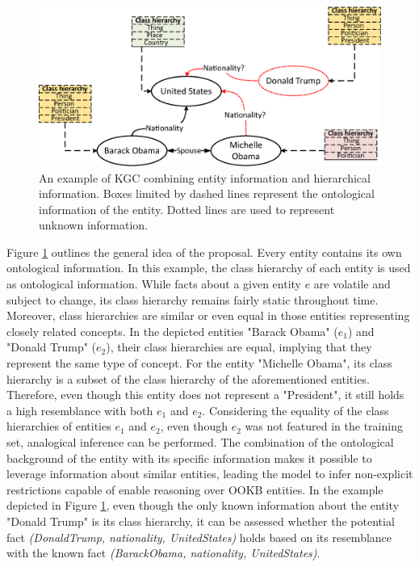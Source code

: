 \begin{figure}
    \centering
    \includegraphics[width=.8\linewidth]{5_kbsintegrationdl/figures/KGCexample.eps}
    \caption{An example of KGC combining entity information and hierarchical information. Boxes limited by dashed lines represent the ontological information of the entity. Dotted lines are used to represent unknown information.}
    \label{fig:kgc_onto_example}
\end{figure}

Figure \ref{fig:kgc_onto_example} outlines the general idea of the proposal. Every entity contains its own ontological information. In this example, the class hierarchy of each entity is used as ontological information. While facts about a given entity $e$ are volatile and subject to change, its class hierarchy remains fairly static throughout time. Moreover, class hierarchies are similar or even equal in those entities representing closely related concepts. In the depicted entities "Barack Obama" ($e_1$) and "Donald Trump" ($e_2$), their class hierarchies are equal, implying that they represent the same type of concept. For the entity "Michelle Obama", its class hierarchy is a subset of the class hierarchy of the aforementioned entities. Therefore, even though this entity does not represent a "President", it still holds a high resemblance with both $e_1$ and $e_2$. Considering the equality of the class hierarchies of entities $e_1$ and $e_2$, even though $e_2$ was not featured in the training set, analogical inference can be performed. The combination of the ontological background of the entity with its specific information makes it possible to leverage information about similar entities, leading the model to infer non-explicit restrictions capable of enable reasoning over OOKB entities. In the example depicted in Figure \ref{fig:kgc_onto_example}, even though the only known information about the entity "Donald Trump" is its class hierarchy, it can be assessed whether the potential fact \textit{(DonaldTrump, nationality, UnitedStates)} holds based on its resemblance with the known fact \textit{(BarackObama, nationality, UnitedStates)}. 




